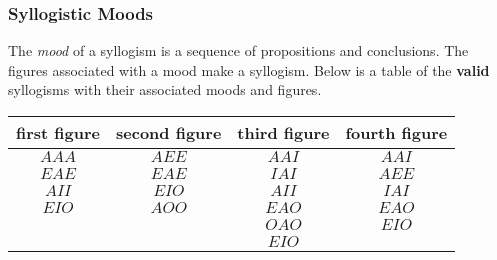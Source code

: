 \documentclass[12pt]{article}
\begin{document}
\subsubsection{Syllogistic Moods}
The \emph{mood} of a syllogism is a sequence of propositions and conclusions.  The figures associated with a mood make a syllogism.  Below is a table of the \textbf{valid} syllogisms with their associated moods and figures.
\begin{center}
\begin{tabular}{c c c c}
\textbf{first figure} & \textbf{second figure} & \textbf{third figure} &\textbf{fourth figure}\\
\hline
$AAA$ & $AEE$ & $AAI$ & $AAI$\\
$EAE$ & $EAE$ & $IAI$ & $AEE$\\
$AII$ & $EIO$ & $AII$ & $IAI$\\
$EIO$ & $AOO$ & $EAO$ & $EAO$\\
& & $OAO$ & $EIO$\\ 
& & $EIO$ &
\end{tabular}
\end{center}
\end{document}
